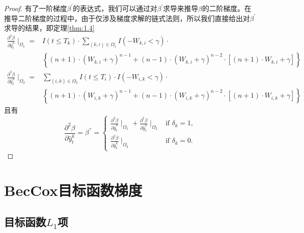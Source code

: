 \begin{proof}
有了一阶梯度$\beta^{'}$的表达式，我们可以通过对$\beta^{'}$求导来推导$\beta$的二阶梯度。在推导二阶梯度的过程中，由于仅涉及梯度求解的链式法则，所以我们直接给出对$\beta^{'}$求导的结果，即定理\ref{thm:1.4}\[
\begin{split}
\frac{\partial^2 \beta}{\partial \hat{y}_t^k} \mid_{\Omega_1} =& I(t\le T_k)\cdot \sum\limits_{(k,i)\in \Omega_1} I(-W_{k,i}<\gamma)\cdot \\
  & \left\{(n+1)\cdot (W_{k,i}+\gamma)^{n-1} + (n-1)\cdot (W_{k,i}+\gamma)^{n-2}\cdot [(n+1)\cdot W_{k,i}+\gamma]\right\} \\
\frac{\partial^2 \beta}{\partial \hat{y}_t^k} \mid_{\Omega_2} =& \sum\limits_{(i,k)\in \Omega_2} I(t\le T_i)\cdot I(-W_{i,k}<\gamma)\cdot \\
  & \left\{(n+1)\cdot (W_{i,k}+\gamma)^{n-1} + (n-1)\cdot (W_{i,k}+\gamma)^{n-2}\cdot [(n+1)\cdot W_{i,k}+\gamma]\right\}
\end{split}
\] 且有$$
\frac{\partial^2 \beta}{\partial \hat{y}_t^k}=\beta^{''}=
\begin{cases}
\frac{\partial^2 \beta}{\partial \hat{y}_t^k} \mid_{\Omega_1} + \frac{\partial^2 \beta}{\partial \hat{y}_t^k} \mid_{\Omega_2} & \text{if } \delta_k = 1,\\
\frac{\partial^2 \beta}{\partial \hat{y}_t^k} \mid_{\Omega_2} & \text{if } \delta_k = 0.
\end{cases}
$$
\end{proof}

\section{BecCox目标函数梯度}

\subsection{目标函数$L_1$项}

